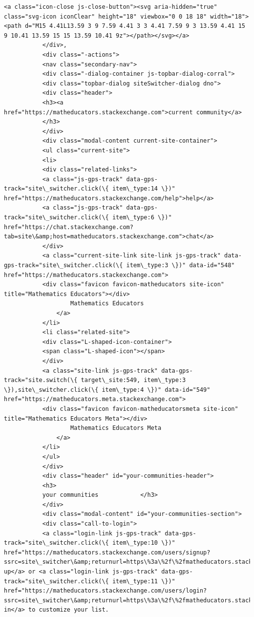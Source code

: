 \documentclass[11pt]{article}
\begin{document}
\begin{Verbatim}[commandchars=\\\{\}]
           <a class="icon-close js-close-button"><svg aria-hidden="true" class="svg-icon iconClear" height="18" viewbox="0 0 18 18" width="18"><path d="M15 4.41L13.59 3 9 7.59 4.41 3 3 4.41 7.59 9 3 13.59 4.41 15 9 10.41 13.59 15 15 13.59 10.41 9z"></path></svg></a>
           </div>,
           <div class="-actions">
           <nav class="secondary-nav">
           <div class="-dialog-container js-topbar-dialog-corral">
           <div class="topbar-dialog siteSwitcher-dialog dno">
           <div class="header">
           <h3><a href="https://matheducators.stackexchange.com">current community</a>
           </h3>
           </div>
           <div class="modal-content current-site-container">
           <ul class="current-site">
           <li>
           <div class="related-links">
           <a class="js-gps-track" data-gps-track="site\_switcher.click(\{ item\_type:14 \})" href="https://matheducators.stackexchange.com/help">help</a>
           <a class="js-gps-track" data-gps-track="site\_switcher.click(\{ item\_type:6 \})" href="https://chat.stackexchange.com?tab=site\&amp;host=matheducators.stackexchange.com">chat</a>
           </div>
           <a class="current-site-link site-link js-gps-track" data-gps-track="site\_switcher.click(\{ item\_type:3 \})" data-id="548" href="https://matheducators.stackexchange.com">
           <div class="favicon favicon-matheducators site-icon" title="Mathematics Educators"></div>
                   Mathematics Educators
               </a>
           </li>
           <li class="related-site">
           <div class="L-shaped-icon-container">
           <span class="L-shaped-icon"></span>
           </div>
           <a class="site-link js-gps-track" data-gps-track="site.switch(\{ target\_site:549, item\_type:3 \}),site\_switcher.click(\{ item\_type:4 \})" data-id="549" href="https://matheducators.meta.stackexchange.com">
           <div class="favicon favicon-matheducatorsmeta site-icon" title="Mathematics Educators Meta"></div>
                   Mathematics Educators Meta
               </a>
           </li>
           </ul>
           </div>
           <div class="header" id="your-communities-header">
           <h3>
           your communities            </h3>
           </div>
           <div class="modal-content" id="your-communities-section">
           <div class="call-to-login">
           <a class="login-link js-gps-track" data-gps-track="site\_switcher.click(\{ item\_type:10 \})" href="https://matheducators.stackexchange.com/users/signup?ssrc=site\_switcher\&amp;returnurl=https\%3a\%2f\%2fmatheducators.stackexchange.com\%2f">Sign up</a> or <a class="login-link js-gps-track" data-gps-track="site\_switcher.click(\{ item\_type:11 \})" href="https://matheducators.stackexchange.com/users/login?ssrc=site\_switcher\&amp;returnurl=https\%3a\%2f\%2fmatheducators.stackexchange.com\%2f">log in</a> to customize your list.

\end{Verbatim}
\end{document}
